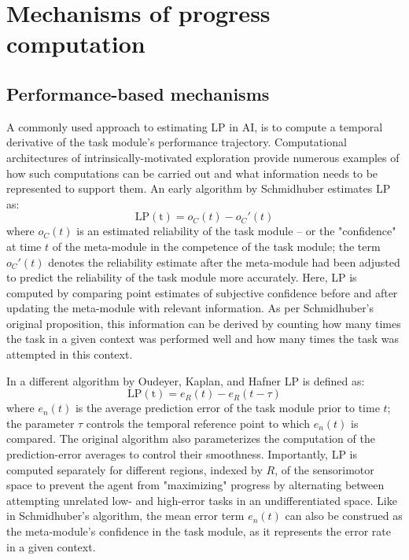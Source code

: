 \section{Mechanisms of progress computation}

\subsection{Performance-based mechanisms}\label{subsec:performance-based_mechanisms}

A commonly used approach to estimating \ac{LP} in \ac{AI}, is to compute a temporal derivative of the task module's performance trajectory. Computational architectures of intrinsically-motivated exploration provide numerous examples of how such computations can be carried out and what information needs to be represented to support them. An early algorithm by Schmidhuber \cite{schmidhuber_curious_1991} estimates \ac{LP} as:
\begin{equation}
    \mathrm{LP(t)} = o_C(t) - o_C'(t)
\end{equation}
where $o_C(t)$ is an estimated reliability of the task module -- or the "confidence" at time $t$ of the meta-module in the competence of the task module; the term $o_C'(t)$ denotes the reliability estimate after the meta-module had been adjusted to predict the reliability of the task module more accurately. Here, \ac{LP} is computed by comparing point estimates of subjective confidence before and after updating the meta-module with relevant information. As per Schmidhuber's original proposition, this information can be derived by counting how many times the task in a given context was performed well and how many times the task was attempted in this context.

In a different algorithm by Oudeyer, Kaplan, and Hafner \cite{oudeyer_intrinsic_2007} \ac{LP} is defined as:
\begin{equation}
    \mathrm{LP(t)} = e_R(t) - e_R(t-\tau)
\end{equation}
where $e_n(t)$ is the average prediction error of the task module prior to time $t$; the parameter $\tau$ controls the temporal reference point to which $e_n(t)$ is compared. The original algorithm also parameterizes the computation of the prediction-error averages to control their smoothness. Importantly, \ac{LP} is computed separately for different regions, indexed by $R$, of the sensorimotor space to prevent the agent from "maximizing" progress by alternating between attempting unrelated low- and high-error tasks in an undifferentiated space. Like in Schmidhuber's algorithm, the mean error term $e_n(t)$ can also be construed as the meta-module's confidence in the task module, as it represents the error rate in a given context. 

